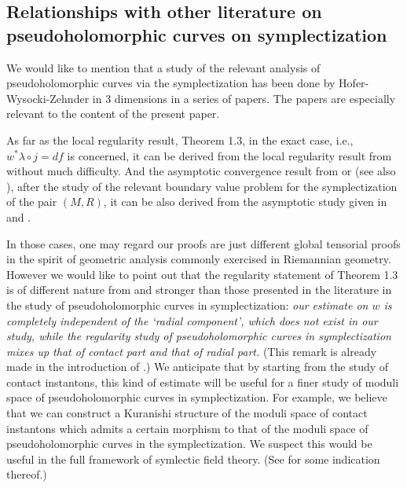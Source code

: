 \documentclass[reqno]{amsart}
\theoremstyle{theorem}
\theoremstyle{definition}
\numberwithin{equation}{section}
\begin{document}
\subsection{Relationships with other literature on pseudoholomorphic curves on symplectization}
\label{subsec:comparison}

We would like to mention that a study of the relevant analysis of pseudoholomorphic
curves via the symplectization has been done by Hofer-Wysocki-Zehnder
in 3 dimensions in a series of papers.
The papers \cite{HWZ:asymptotics,HWZ:asymptotics-correction}
are especially relevant to the content of the present paper.

As far as the local  regularity result, Theorem 1.3,  in the exact case, i.e.,
$w^*\lambda \circ j = df$ is concerned,  it can be derived from the local regularity result from \cite{HWZ:asymptotics,HWZ:asymptotics-correction}
without much difficulty.  And the asymptotic convergence
result from \cite{HWZ:asymptotics,HWZ:asymptotics-correction} or \cite{wendl:lecture}
(see also \cite{bourgeois}), after the study of the relevant boundary value problem
for the symplectization of  the pair $(M,R)$, it can be also derived from the asymptotic study given in \cite{HWZ:asymptotics,HWZ:asymptotics-correction}  and \cite{wendl:lecture}.

In those cases, one may regard our proofs are just
different global tensorial proofs  in the spirit of geometric analysis
commonly exercised in Riemannian geometry.  However we would like to
point out that the regularity statement of Theorem 1.3 is of
different nature from and stronger than those presented in
the literature  in the study of pseudoholomorphic curves in symplectization:
\emph{our estimate on $w$ is completely independent of the `radial component',
which does not exist in our study, while the regularity study of
pseudoholomorphic curves in symplectization mixes up that of contact part
and that of radial part.} (This remark is already made in the introduction of
\cite{oh-wang:CR-map1}.) We anticipate that  by starting from
the study of contact instantons, this kind of estimate will be useful
for a finer study of moduli space of pseudoholomorphic curves in symplectization.
For example, we believe that we can construct a Kuranishi structure of
the moduli space of  contact instantons which admits a certain morphism to that of
the moduli space of pseudoholomorphic curves in the symplectization. We suspect
this would be useful in the full framework of symlectic field theory.
(See \cite{oh:contacton-gluing} for  some indication thereof.)
\end{document}
